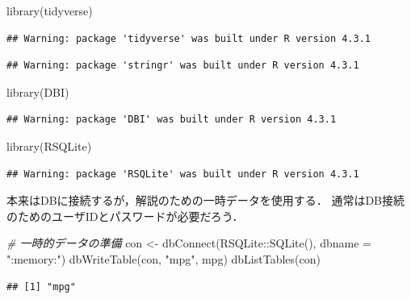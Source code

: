 \documentclass[
]{article}
\newenvironment{Shaded}{\begin{snugshade}}{\end{snugshade}}
\newcommand{\AttributeTok}[1]{\textcolor[rgb]{0.77,0.63,0.00}{#1}}
\newcommand{\CommentTok}[1]{\textcolor[rgb]{0.56,0.35,0.01}{\textit{#1}}}
\newcommand{\FunctionTok}[1]{\textcolor[rgb]{0.00,0.00,0.00}{#1}}
\newcommand{\NormalTok}[1]{#1}
\newcommand{\OtherTok}[1]{\textcolor[rgb]{0.56,0.35,0.01}{#1}}
\newcommand{\SpecialCharTok}[1]{\textcolor[rgb]{0.00,0.00,0.00}{#1}}
\newcommand{\StringTok}[1]{\textcolor[rgb]{0.31,0.60,0.02}{#1}}
\begin{document}
\begin{Shaded}
\begin{Highlighting}[]
\FunctionTok{library}\NormalTok{(tidyverse)}
\end{Highlighting}
\end{Shaded}

\begin{verbatim}
## Warning: package 'tidyverse' was built under R version 4.3.1
\end{verbatim}

\begin{verbatim}
## Warning: package 'stringr' was built under R version 4.3.1
\end{verbatim}

\begin{Shaded}
\begin{Highlighting}[]
\FunctionTok{library}\NormalTok{(DBI)}
\end{Highlighting}
\end{Shaded}

\begin{verbatim}
## Warning: package 'DBI' was built under R version 4.3.1
\end{verbatim}

\begin{Shaded}
\begin{Highlighting}[]
\FunctionTok{library}\NormalTok{(RSQLite)}
\end{Highlighting}
\end{Shaded}

\begin{verbatim}
## Warning: package 'RSQLite' was built under R version 4.3.1
\end{verbatim}

本来はDBに接続するが，解説のための一時データを使用する．
通常はDB接続のためのユーザIDとパスワードが必要だろう．

\begin{Shaded}
\begin{Highlighting}[]
  \CommentTok{\# 一時的データの準備}
\NormalTok{con }\OtherTok{\textless{}{-}} \FunctionTok{dbConnect}\NormalTok{(RSQLite}\SpecialCharTok{::}\FunctionTok{SQLite}\NormalTok{(), }\AttributeTok{dbname =} \StringTok{":memory:"}\NormalTok{)}
\FunctionTok{dbWriteTable}\NormalTok{(con, }\StringTok{"mpg"}\NormalTok{, mpg)}
\FunctionTok{dbListTables}\NormalTok{(con)}
\end{Highlighting}
\end{Shaded}

\begin{verbatim}
## [1] "mpg"
\end{verbatim}
\end{document}

